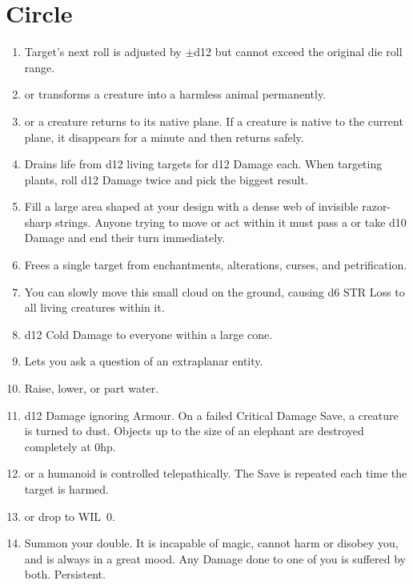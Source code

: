 \documentclass[itdr]{subfiles}
\begin{document}
\section{ Circle}
\def \spellcircle {5}
\begin{enumerate}
	\item {} Target's next roll is adjusted by $\pm$d12 but cannot exceed the original die roll range.
	\item {}  or transforms a creature into a harmless animal permanently.
	\item {}  or a creature returns to its native plane. If a creature is native to the current plane, it disappears for a minute and then returns safely.
	\item {} Drains life from d12 living targets for d12 Damage each. When targeting plants, roll d12 Damage twice and pick the biggest result.
	\item {} Fill a large area shaped at your design with a dense web of invisible razor-sharp strings. Anyone trying to move or act within it must pass a  or take d10 Damage and end their turn immediately.
	\item {} Frees a single target from enchantments, alterations, curses, and \mbox{petrification}.
	\item {} You can slowly move this small cloud on the ground, causing d6 STR Loss to all living creatures within it.
	\item {} d12 Cold Damage to everyone within a large cone.
	\item {} Lets you ask a question of an extraplanar entity.
	\item {} Raise, lower, or part water.
	\item {} d12 Damage ignoring Armour. On a failed Critical Damage Save, a creature is turned to dust. Objects up to the size of an elephant are destroyed completely at 0hp.
	\item {}  or a humanoid is controlled telepathically. The Save is repeated each time the target is harmed.
	\item {}  or drop to WIL~0.
	\item {} Summon your double. It is incapable of magic, cannot harm or disobey you, and is always in a great mood. Any Damage done to one of you is suffered by both. \mbox{Persistent.}

\end{enumerate}
\end{document}
